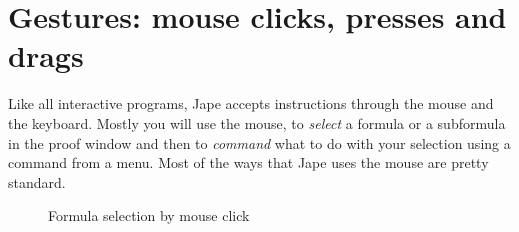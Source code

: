 \documentclass[11pt]{book}
\begin{document}
\chapter{Gestures: mouse clicks, presses and drags}
\label{chap:gestures}

Like all interactive programs, Jape accepts instructions through the mouse and the keyboard. Mostly you will use the mouse, to \emph{select} a formula or a subformula in the proof window and then to \emph{command} what to do with your selection using a command from a menu. Most of the ways that Jape uses the mouse are pretty standard.

\begin{figure}
\centering
{}
\quad
{}
\quad
{}
\quad
{}
\caption{Formula selection by mouse click}
\end{figure}
\end{document}
